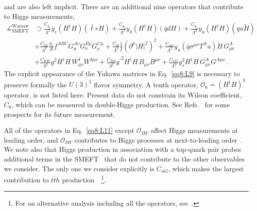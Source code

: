 \documentclass[../report.tex]{subfiles}
\begin{document}
and are also left implicit.
There are an additional nine operators that contribute to Higgs measurements, 
%
{\small
\begin{align}
\label{eq8:L9}
\mathcal{L}_\text{SMEFT}^\text{Warsaw} &\supset  \frac{C_{y_e}}{\Lambda^2} y_e (H^\dag H)(\bar \ell e H) + \frac{C_{y_d}}{\Lambda^2} y_d (H^\dag H)(\bar q d H) + \frac{C_{y_u}}{\Lambda^2} y_u (H^\dag H)(\bar q u \widetilde H) \nonumber \\
&+ \frac{C_{3G}}{\Lambda^2} \frac{g_s}{3!} f^{ABC} G_\mu^{A\nu} G_\nu^{B\rho} G_\rho^{C\mu}  + \frac{C_{H}}{\Lambda^2} \frac{1}{2}\left(\partial^\mu |H|^2\right)^2  + \frac{C_{uG}}{\Lambda^2} y_u (\bar q \sigma^{\mu\nu} T^A u) \widetilde H \, G_{\mu\nu}^A   \nonumber \\
&+ \frac{C_{WW}}{\Lambda^2} g^2 H^\dag H\, W^I_{\mu\nu} W^{I\mu\nu} + \frac{C_{BB}}{\Lambda^2} {g^\prime}^2 H^\dag H\, B_{\mu\nu} B^{\mu\nu} + \frac{C_{GG}}{\Lambda^2} g_s^2 H^\dag H\, G^A_{\mu\nu} G^{A\mu\nu} \, .
\end{align}}
The explicit appearance of the Yukawa matrices in Eq.~\eqref{eq8:L9} is necessary to preserve formally the $U(3)^5$ flavor symmetry.
A tenth operator, $\mathcal{O}_6 = \left(H^{\dagger} H\right)^3$ operator, is not listed here. Present data do not constrain
its Wilson coefficient, $C_6$, which can be measured in double-Higgs production.
See Refs.~\cite{Banerjee:2018yxy, Goncalves:2018qas} for some prospects for its future measurement.



All of the operators in Eq.~\eqref{eq8:L11} except $\mathcal{O}_{3W}$ affect Higgs measurements at leading order, and
$\mathcal{O}_{3W}$ contributes to Higgs processes at next-to-leading order~\cite{Alonso:2013hga, Hartmann:2015oia, Hartmann:2015aia, Dedes:2018seb, Dawson:2018liq}.
We note also that Higgs production in association with a top-quark pair probes additional terms in the 
SMEFT~\cite{Maltoni:2016yxb, AguilarSaavedra:2018nen, Ellis:2018gqa} that do not contribute to the other observables we consider.
The only one we consider explicitly is $C_{uG}$, which makes the largest contribution to $t \bar{t} h$ production~\cite{Ellis:2018gqa}~\footnote{For 
an alternative analysis including all the operators, see~\cite{Murphy:2017omb}.}.
\end{document}
